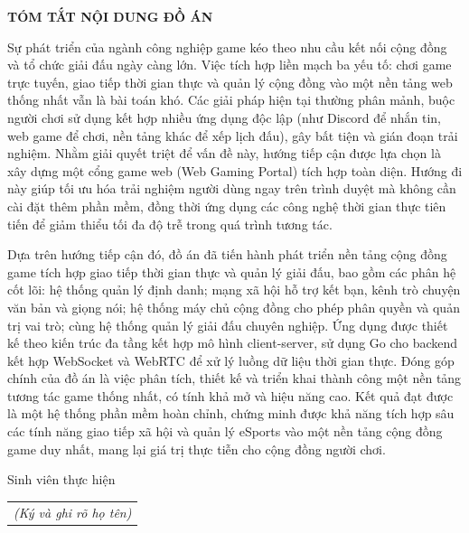 \documentclass[../DoAn.tex]{subfiles}
\begin{document}
\begin{center}
    \Large{\textbf{TÓM TẮT NỘI DUNG ĐỒ ÁN}}\\
\end{center}
\vspace{1cm}
Sự phát triển của ngành công nghiệp game kéo theo nhu cầu kết nối cộng đồng và tổ chức giải đấu ngày càng lớn. Việc tích hợp liền mạch ba yếu tố: chơi game trực tuyến, giao tiếp thời gian thực và quản lý cộng đồng vào một nền tảng web thống nhất vẫn là bài toán khó. Các giải pháp hiện tại thường phân mảnh, buộc người chơi sử dụng kết hợp nhiều ứng dụng độc lập (như Discord để nhắn tin, web game để chơi, nền tảng khác để xếp lịch đấu), gây bất tiện và gián đoạn trải nghiệm. Nhằm giải quyết triệt để vấn đề này, hướng tiếp cận được lựa chọn là xây dựng một cổng game web (Web Gaming Portal) tích hợp toàn diện. Hướng đi này giúp tối ưu hóa trải nghiệm người dùng ngay trên trình duyệt mà không cần cài đặt thêm phần mềm, đồng thời ứng dụng các công nghệ thời gian thực tiên tiến để giảm thiểu tối đa độ trễ trong quá trình tương tác. 

Dựa trên hướng tiếp cận đó, đồ án đã tiến hành phát triển nền tảng cộng đồng game tích hợp giao tiếp thời gian thực và quản lý giải đấu, bao gồm các phân hệ cốt lõi: hệ thống quản lý định danh; mạng xã hội hỗ trợ kết bạn, kênh trò chuyện văn bản và giọng nói; hệ thống máy chủ cộng đồng cho phép phân quyền và quản trị vai trò; cùng hệ thống quản lý giải đấu chuyên nghiệp. Ứng dụng được thiết kế theo kiến trúc đa tầng kết hợp mô hình client-server, sử dụng Go cho backend kết hợp WebSocket và WebRTC để xử lý luồng dữ liệu thời gian thực. Đóng góp chính của đồ án là việc phân tích, thiết kế và triển khai thành công một nền tảng tương tác game thống nhất, có tính khả mở và hiệu năng cao. Kết quả đạt được là một hệ thống phần mềm hoàn chỉnh, chứng minh được khả năng tích hợp sâu các tính năng giao tiếp xã hội và quản lý eSports vào một nền tảng cộng đồng game duy nhất, mang lại giá trị thực tiễn cho cộng đồng người chơi.


\begin{flushright}
Sinh viên thực hiện\\
\begin{tabular}{@{}c@{}}
\textit{(Ký và ghi rõ họ tên)}
\end{tabular}
\end{flushright}
\end{document}
